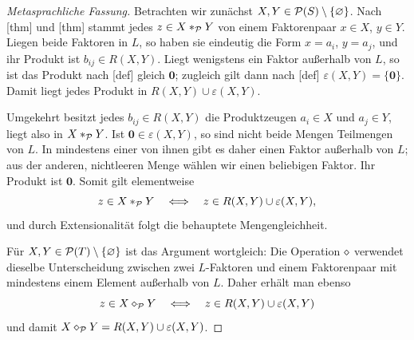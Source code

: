 \documentclass[main.tex]{subfiles}
\begin{document}
\begin{proof}[Metasprachliche Fassung]
Betrachten wir zunächst \(X,Y\in\mathcal{P}(S)\setminus\{\varnothing\}\). Nach
[thm] und
[thm] stammt jedes
\(z\in X\mathbin{\ast}_{\mathcal P}Y\) von einem Faktorenpaar \(x\in X\),
\(y\in Y\). Liegen beide Faktoren in \(L\), so haben sie eindeutig die
Form \(x=a_i\), \(y=a_j\), und ihr Produkt ist \(b_{ij}\in R(X,Y)\).
Liegt wenigstens ein Faktor außerhalb von \(L\), so ist das Produkt nach
[def] gleich \(\mathbf0\); zugleich
gilt dann nach [def]
\(\varepsilon(X,Y)=\{\mathbf0\}\). Damit liegt jedes Produkt in
\(R(X,Y)\cup\varepsilon(X,Y)\).

Umgekehrt besitzt jedes \(b_{ij}\in R(X,Y)\) die Produktzeugen
\(a_i\in X\) und \(a_j\in Y\), liegt also in
\(X\mathbin{\ast}_{\mathcal P}Y\). Ist \(\mathbf0\in\varepsilon(X,Y)\), so
sind nicht beide Mengen Teilmengen von \(L\). In mindestens einer von ihnen
gibt es daher einen Faktor außerhalb von \(L\); aus der anderen,
nichtleeren Menge wählen wir einen beliebigen Faktor. Ihr Produkt ist
\(\mathbf0\). Somit gilt elementweise
\[
  z\in X\mathbin{\ast}_{\mathcal P}Y
  \quad\Longleftrightarrow\quad
  z\in R(X,Y)\cup\varepsilon(X,Y),
\]
und durch Extensionalität folgt die behauptete Mengengleichheit.

Für \(X,Y\in\mathcal{P}(T)\setminus\{\varnothing\}\) ist das Argument wortgleich: Die Operation
\(\mathbin{\diamond}\) verwendet dieselbe Unterscheidung zwischen zwei
\(L\)-Faktoren und einem Faktorenpaar mit mindestens einem Element außerhalb
von \(L\). Daher erhält man ebenso
\[
  z\in X\mathbin{\diamond}_{\mathcal P}Y
  \quad\Longleftrightarrow\quad
  z\in R(X,Y)\cup\varepsilon(X,Y)
\]
und damit
\(X\mathbin{\diamond}_{\mathcal P}Y=R(X,Y)\cup\varepsilon(X,Y)\).
\end{proof}
\end{document}
